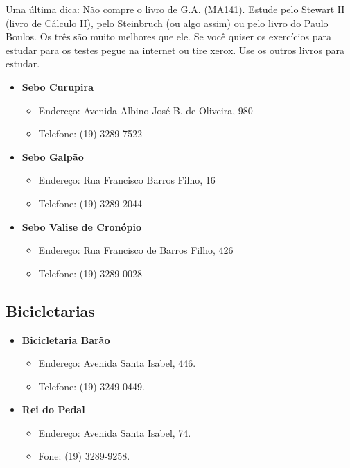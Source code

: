 Uma última dica: Não compre o livro de G.A. (MA141). Estude pelo Stewart II
(livro de Cálculo II), pelo Steinbruch (ou algo assim) ou pelo livro do Paulo
Boulos. Os três são muito melhores que ele. Se você quiser os exercícios para
estudar para os testes pegue na internet ou tire xerox. Use os outros livros
para estudar.

\begin{itemize}
\item  \textbf{Sebo Curupira}
\begin{itemize}
\item  Endereço: Avenida Albino José B. de Oliveira, 980
\item  Telefone: (19) 3289-7522
\end{itemize}
\end{itemize}

\begin{itemize}
\item  \textbf{Sebo Galpão}
\begin{itemize}
\item  Endereço: Rua Francisco Barros Filho, 16
\item  Telefone: (19) 3289-2044
\end{itemize}
\end{itemize}

\begin{itemize}
\item  \textbf{Sebo Valise de Cronópio}
\begin{itemize}
\item  Endereço: Rua Francisco de Barros Filho, 426
\item  Telefone: (19) 3289-0028
\end{itemize}
\end{itemize}

\subsection{Bicicletarias}

\begin{itemize}
\item  \textbf{Bicicletaria Barão}
\begin{itemize}
\item  Endereço: Avenida Santa Isabel, 446.
\item  Telefone: (19) 3249-0449.
\end{itemize}
\end{itemize}

\begin{itemize}
\item  \textbf{Rei do Pedal}
\begin{itemize}
\item  Endereço: Avenida Santa Isabel, 74.
\item  Fone: (19) 3289-9258.
\end{itemize}
\end{itemize}

